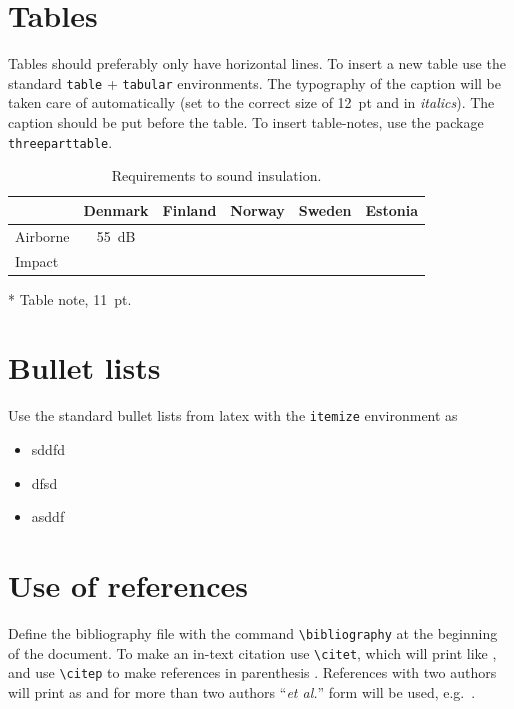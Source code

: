 \documentclass[unicode-math,microtype]{interarticle}
\newcommand\comm[1]{\texttt{\textbackslash #1}}
\begin{document}
\section{Tables}
Tables should preferably only have horizontal lines.
To insert a new table use the standard \texttt{table} + \texttt{tabular} environments.
The typography of the caption will be taken care of automatically (set to the correct size of \SI{12}{pt} and in \textit{italics}).
The caption should be put before the table.
To insert table-notes, use the package \texttt{threeparttable}.

\begin{table}[htb]
  \small
  \caption{Requirements to sound insulation.}%
  \label{tab:table1}
  \begin{threeparttable}
    \begin{tabular}{lccccc}\toprule
      & Denmark     & Finland & Norway & Sweden & Estonia \\\midrule
      Airborne & \SI{55}{dB}\tnote{*} &         &        &        &         \\
      Impact   &             &         &        &        &         \\\bottomrule
    \end{tabular}
  \begin{tablenotes}
  \item[*] Table note, \SI{11}{pt}.
  \end{tablenotes}
  \end{threeparttable}
\end{table}

\section{Bullet lists}
Use the standard bullet lists from latex with the \texttt{itemize} environment as
\begin{itemize}
  \item sddfd
  \item dfsd
  \item asddf
\end{itemize}

\section{Use of references}
Define the bibliography file with the command \comm{bibliography} at the beginning of the document.
To make an in-text citation use \comm{citet}, which will print like \citet{Isaksson1999}, and use \comm{citep} to make references in parenthesis \citep{Isaksson1999}.
References with two authors will print as \citet{Taylor1991} and for more than two authors ``\emph{et al.}'' form will be used, e.g.\ \citet{Showalter1987}.\par
\end{document}
